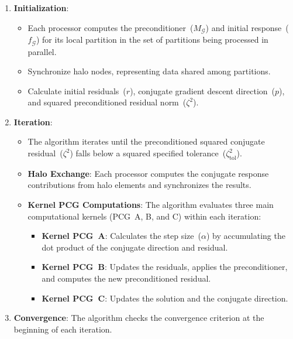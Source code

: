 \documentclass[]             %
{NASA}                       %
\begin{document}
\begin{enumerate}
    \item{\textbf{Initialization}:
    \begin{itemize}
        \item Each processor computes the preconditioner~($M_{\mathcal{G}}$) and initial re\-sponse~(${f_{\mathcal{G}}}$) for its local partition in the set of partitions being processed in parallel.
        \item Synchronize halo nodes, representing data shared among partitions.
        \item Calculate initial residuals~($r$), conjugate gradient descent direction~($p$), and squared preconditioned residual norm~($\zeta^2$).
     \end{itemize}}
    \item{\textbf{Iteration}:
    \begin{itemize}
        \item The algorithm iterates until the preconditioned squared conjugate residual~($\zeta^2$) falls below a squared specified tolerance~($\zeta_{\mathrm{tol}}^{2}$).
        \item \textbf{Halo Exchange}: Each processor computes the conjugate response contributions from halo elements and synchronizes the results.
        \item{\textbf{Kernel PCG Computations}: The algorithm evaluates three main computational kernels (PCG~A, B, and C) within each iteration:
        \begin{itemize}
            \item \textbf{Kernel PCG~A}: Calculates the step size~($\alpha$) by accumulating the dot product of the conjugate direction and residual.
            \item \textbf{Kernel PCG~B}: Updates the residuals, applies the preconditioner, and computes the new preconditioned residual.
            \item \textbf{Kernel PCG~C}: Updates the solution and the conjugate direction.
        \end{itemize}}
    \end{itemize}}
    \item \textbf{Convergence}: The algorithm checks the convergence criterion at the beginning of each iteration.
\end{enumerate}
\end{document}
